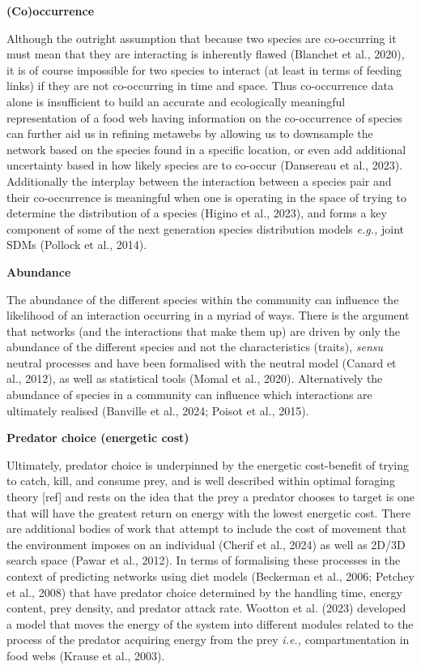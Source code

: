 \documentclass[
]{article}
\begin{document}
\textbf{(Co)occurrence}

Although the outright assumption that because two species are
co-occurring it must mean that they are interacting is inherently flawed
(Blanchet et al., 2020), it is of course impossible for two species to
interact (at least in terms of feeding links) if they are not
co-occurring in time and space. Thus co-occurrence data alone is
insufficient to build an accurate and ecologically meaningful
representation of a food web having information on the co-occurrence of
species can further aid us in refining metawebs by allowing us to
downsample the network based on the species found in a specific
location, or even add additional uncertainty based in how likely species
are to co-occur (Dansereau et al., 2023). Additionally the interplay
between the interaction between a species pair and their co-occurrence
is meaningful when one is operating in the space of trying to determine
the distribution of a species (Higino et al., 2023), and forms a key
component of some of the next generation species distribution models
\emph{e.g.,} joint SDMs (Pollock et al., 2014).

\textbf{Abundance}

The abundance of the different species within the community can
influence the likelihood of an interaction occurring in a myriad of
ways. There is the argument that networks (and the interactions that
make them up) are driven by only the abundance of the different species
and not the characteristics (traits), \emph{sensu} neutral processes and
have been formalised with the neutral model (Canard et al., 2012), as
well as statistical tools (Momal et al., 2020). Alternatively the
abundance of species in a community can influence which interactions are
ultimately realised (Banville et al., 2024; Poisot et al., 2015).

\textbf{Predator choice (energetic cost)}

Ultimately, predator choice is underpinned by the energetic cost-benefit
of trying to catch, kill, and consume prey, and is well described within
optimal foraging theory {[}ref{]} and rests on the idea that the prey a
predator chooses to target is one that will have the greatest return on
energy with the lowest energetic cost. There are additional bodies of
work that attempt to include the cost of movement that the environment
imposes on an individual (Cherif et al., 2024) as well as 2D/3D search
space (Pawar et al., 2012). In terms of formalising these processes in
the context of predicting networks using diet models (Beckerman et al.,
2006; Petchey et al., 2008) that have predator choice determined by the
handling time, energy content, prey density, and predator attack rate.
Wootton et al. (2023) developed a model that moves the energy of the
system into different modules related to the process of the predator
acquiring energy from the prey \emph{i.e.,} compartmentation in food
webs (Krause et al., 2003).
\end{document}

